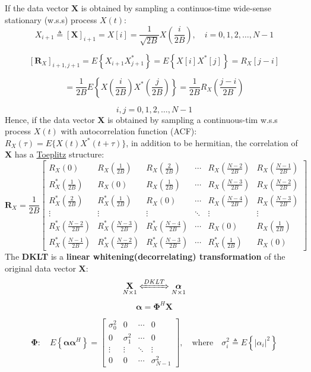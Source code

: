 If the data vector \(\mathbf{X}\) is obtained by sampling a continuos-time wide-sense stationary (w.s.s) process \(X(t)\):
\[
X_{i+1} \triangleq [\mathbf{X}]_{i+1} = X[i] = \frac{1}{\sqrt{2B}} X\left( \frac{i}{2B} \right), \quad i = 0, 1, 2, \ldots, N-1
\]

\[
[\mathbf{R}_X]_{i+1,j+1} = E\left\{ X_{i+1} X_{j+1}^* \right\} = E\left\{ X[i] X^*[j] \right\} = R_X[j-i]
\]

\[
= \frac{1}{2B} E\left\{ X\left( \frac{i}{2B} \right) X^*\left( \frac{j}{2B} \right) \right\}
= \frac{1}{2B} R_X\left( \frac{j-i}{2B} \right)
\]

\[
i, j = 0, 1, 2, \ldots, N-1
\]
Hence, if the data vector \(\mathbf{X}\) is obtained by sampling a continuous-tim w.s.s process \(X(t)\) with autocorrelation function (ACF):
\(
R_X(\tau)=E\{X(t)X^*(t+\tau)\}
\),
in addition to be hermitian, the correlation of \(\mathbf{X}\) has a \underline{Toeplitz} structure:
\[
\mathbf{R}_X = \frac{1}{2B}
\begin{bmatrix}
    R_X(0) & R_X\left(\frac{1}{2B}\right) & R_X\left(\frac{2}{2B}\right) & \cdots & R_X\left(\frac{N-2}{2B}\right) & R_X\left(\frac{N-1}{2B}\right) \\
    R_X^*\left(\frac{1}{2B}\right) & R_X(0) & R_X\left(\frac{1}{2B}\right) & \cdots & R_X\left(\frac{N-3}{2B}\right) & R_X\left(\frac{N-2}{2B}\right) \\
    R_X^*\left(\frac{2}{2B}\right) & R_X^*\left(\frac{1}{2B}\right) & R_X(0) & \cdots & R_X\left(\frac{N-4}{2B}\right) & R_X\left(\frac{N-3}{2B}\right) \\
    \vdots & \vdots & \vdots & \ddots & \vdots & \vdots \\
    R_X^*\left(\frac{N-2}{2B}\right) & R_X^*\left(\frac{N-3}{2B}\right) & R_X^*\left(\frac{N-4}{2B}\right) & \cdots & R_X(0) & R_X\left(\frac{1}{2B}\right) \\
    R_X^*\left(\frac{N-1}{2B}\right) & R_X^*\left(\frac{N-2}{2B}\right) & R_X^*\left(\frac{N-3}{2B}\right) & \cdots & R_X^*\left(\frac{1}{2B}\right) & R_X(0)
\end{bmatrix}
\]
The \textbf{DKLT} is a \textbf{linear whitening(decorrelating) transformation} of the original data vector \(\mathbf{X}\):
\[
\underset{N\times1}{\mathbf{X}}\xLeftrightarrow{DKLT}\underset{N\times1}{\boldsymbol{\alpha}}
\]
\[
\boldsymbol{\alpha}=\boldsymbol{\Phi}^H\mathbf{X}
\]


\[
\mathbf{\Phi}:\quad E\left\{ \boldsymbol{\alpha}\boldsymbol{\alpha}^H \right\} =
\begin{bmatrix}
\sigma_0^2 & 0 & \cdots & 0 \\
0 & \sigma_1^2 & \cdots & 0 \\
\vdots & \vdots & \ddots & \vdots \\
0 & 0 & \cdots & \sigma_{N-1}^2
\end{bmatrix},
\quad \text{where} \quad
\sigma_i^2 \triangleq E\left\{|\alpha_i|^2\right\}
\]

